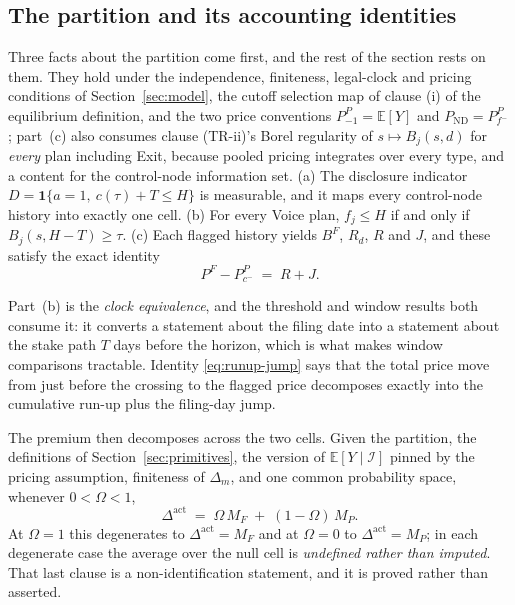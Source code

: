 \documentclass[11pt]{article}
\makeatletter
\newcommand{\compatlabel}[2]{\begingroup\phantomsection\def\@currentlabel{#1}\label{#2}\endgroup}
\newcommand{\Eop}{\mathbb{E}}
\newcommand{\ind}{\mathbf{1}}
\newcommand{\Dact}{\Delta^{\mathrm{act}}}
\newcommand{\ND}{\mathrm{ND}}
\makeatother
\begin{document}
\subsection{The partition and its accounting identities}
\label{sec:partition-results}

Three facts about the partition come first, and the rest of the section rests on them. They hold
under the independence, finiteness, legal-clock and pricing conditions of Section~\ref{sec:model},
the cutoff selection map of clause (i) of the equilibrium definition, and the two price conventions
$P_{-1}^P=\Eop[Y]$ and $P_{\ND}=P_{f^-}^P$; part~(c) also consumes clause (TR-ii)'s Borel regularity
of $s\mapsto B_j(s,d)$ for \emph{every} plan including Exit, because pooled pricing integrates over
every type, and a content for the control-node information set. (a) The disclosure indicator
$D=\ind\{a=1,\ c(\tau)+T\leq H\}$ is measurable, and it maps every control-node history into exactly
one cell. (b) For every Voice plan, $f_j\leq H$ if and only if $B_j(s,H-T)\geq\tau$. (c) Each flagged
history yields $B^F$, $R_d$, $R$ and $J$, and these satisfy the exact identity
\begin{equation}
\label{eq:runup-jump}
P^F - P_{c^-}^P \;=\; R + J.
\end{equation}
\compatlabel{1}{lem:D1}

Part~(b) is the \emph{clock equivalence}, and the threshold and window results both consume it: it
converts a statement about the filing date into a statement about the stake path $T$ days before the
horizon, which is what makes window comparisons tractable. Identity \eqref{eq:runup-jump} says that the total price move from just before the crossing to
the flagged price decomposes exactly into the cumulative run-up plus the filing-day jump.

The premium then decomposes across the two cells. Given the partition, the definitions of
Section~\ref{sec:primitives}, the version of $\Eop[Y\mid\mathcal I]$ pinned by the pricing
assumption, finiteness of $\Delta_m$, and one common probability space, whenever $0<\Omega<1$,
\begin{equation}
\label{eq:L1}
\Dact \;=\; \Omega\,M_F \;+\; (1-\Omega)\,M_P .
\end{equation}
At $\Omega=1$ this degenerates to $\Dact=M_F$ and at $\Omega=0$ to $\Dact=M_P$; in each degenerate
case the average over the null cell is \emph{undefined rather than imputed}. That last clause is a
non-identification statement, and it is proved rather than asserted.\compatlabel{2}{lem:L1}
\end{document}
